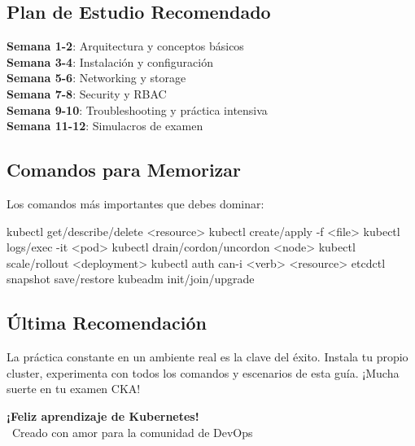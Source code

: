 \documentclass[11pt,a4paper]{article}
\begin{document}
\subsection{Plan de Estudio Recomendado}

\begin{tipbox}
\textbf{Semana 1-2}: Arquitectura y conceptos básicos\\
\textbf{Semana 3-4}: Instalación y configuración\\
\textbf{Semana 5-6}: Networking y storage\\
\textbf{Semana 7-8}: Security y RBAC\\
\textbf{Semana 9-10}: Troubleshooting y práctica intensiva\\
\textbf{Semana 11-12}: Simulacros de examen
\end{tipbox}

\subsection{Comandos para Memorizar}

Los comandos más importantes que debes dominar:

\begin{commandbox}
kubectl get/describe/delete <resource>
kubectl create/apply -f <file>
kubectl logs/exec -it <pod>
kubectl drain/cordon/uncordon <node>
kubectl scale/rollout <deployment>
kubectl auth can-i <verb> <resource>
etcdctl snapshot save/restore
kubeadm init/join/upgrade
\end{commandbox}

\subsection{Última Recomendación}

\begin{warningbox}
La práctica constante en un ambiente real es la clave del éxito. Instala tu propio cluster, experimenta con todos los comandos y escenarios de esta guía. ¡Mucha suerte en tu examen CKA!
\end{warningbox}

\vfill
\begin{center}
\textcolor{k8sblue}{\Large\textbf{¡Feliz aprendizaje de Kubernetes!}}\\[0.5cm]
\textcolor{k8sdarkgray}{\faHeart\ Creado con amor para la comunidad de DevOps}
\end{center}
\end{document}
